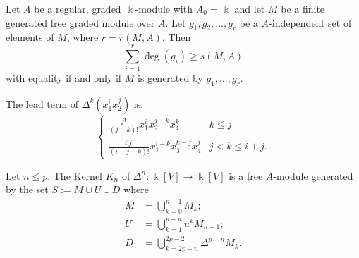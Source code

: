 \documentclass[10pt,a4paper]{amsart}
\newcommand{\kk}{\Bbbk}
\begin{document}
\begin{prop}\label{freetest} Let $A$ be a regular, graded $\kk$-module with $A_0= \kk$ and let $M$ be a finite generated free graded module over $A$. Let $g_1, g_2, \ldots, g_r$ be a $A$-independent set of elements of $M$, where $r = r(M,A)$. Then
\[\sum_{i=1}^r \deg(g_i) \geq s(M,A)\] with equality if and only if $M$ is generated by $g_1, \ldots, g_r$.
\end{prop}

\begin{Lemma}\label{v2v2leadterms}
The lead term of $\Delta^k(x_1^ix_2^j)$ is:
\[\left\{ \begin{array}{lr} \frac{j!}{(j-k)!}x_1^i x_2^{j-k} x_4^k & k \leq j \\ \frac{i! j!}{(i-j-k)!}x_1^{i-k}x_3^{k-j}x_4^j & j<k \leq i+j. \end{array} \right.\]
\end{Lemma}

\begin{Theorem} Let $n \leq p$. The Kernel $K_n$ of $\Delta^n: \kk[V] \rightarrow \kk[V]$ is a free $A$-module generated by the set $S:= M \cup U \cup D$ where
\begin{align*}
M &= \bigcup_{k=0}^{n-1} M_k;\\
U &= \bigcup_{k=1}^{p-n} u^kM_{n-1};\\
D &= \bigcup_{k=2p-n}^{2p-2} \Delta^{p-n}M_k. 
\end{align*}
\end{Theorem}
\end{document}
